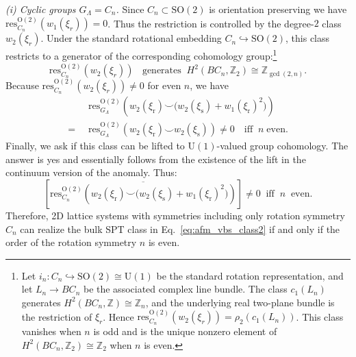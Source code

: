 \documentclass[aps,prx,reprint,superscriptaddress,twocolumn,amsmath,amssymb,amsfonts, nofootinbib]{revtex4-2}
\newcommand{\SO}{\text{SO}}
\newcommand{\res}{\text{res}}
\newcommand{\Z}{\mathbb{Z}}
\theoremstyle{apsstyle}
\begin{document}
\medskip

\noindent\textit{(i) Cyclic groups $G_{\Lambda}=C_{n}$.}
Since $C_{n}\subset \SO(2)$ is orientation preserving we have $\res^{\mathrm{O(2)}}_{C_{n}}(w_{1}(\xi_{r}))=0$. 
Thus the restriction is controlled by the degree-$2$ class $w_2(\xi_r)$. Under the standard rotational embedding $C_n\hookrightarrow\mathrm{SO}(2)$, this class restricts to a generator of the corresponding cohomology group:\footnote{Let $i_n:C_n\hookrightarrow\mathrm{SO}(2)\cong\mathrm{U}(1)$ be the standard rotation representation, and let $L_n\to BC_n$ be the associated complex line bundle. The class $c_1(L_n)$ generates $H^2(BC_n,\mathbb Z)\cong\mathbb Z_n$, and the underlying real two-plane bundle is the restriction of $\xi_r$. Hence $\res_{C_n}^{\mathrm{O}(2)}(w_2(\xi_r)) =\rho_2(c_1(L_n))$. This class vanishes when $n$ is odd and is the unique nonzero element of $H^2(BC_n,\mathbb Z_2)\cong\mathbb Z_2$ when $n$ is even.}
\begin{equation}
    \res^{\mathrm{O(2)}}_{C_n}(w_{2}(\xi_{r}))\;\; \text{ generates}\;\; H^{2}(BC_{n},\Z_{2})\cong \Z_{\gcd(2,n)}.
    \label{eq:cyclic_w2_gcd}
\end{equation}
Because $\res^{\mathrm{O(2)}}_{C_n}(w_{2}(\xi_{r}))\neq 0$ for even $n$, we have
\begin{align}
    &\res^{\mathrm{O(2)}}_{G_{\Lambda}}\left(w_{2}(\xi_{\mathrm{r}})\smile\bigl(w_{2}(\xi_{\mathrm{s}})+w_{1}(\xi_{\mathrm{r}})^{2}\bigr)\right )\nonumber \\
     =\;\;&\res^{\mathrm{O(2)}}_{G_{\Lambda}}\left(w_{2}(\xi_{\mathrm{r}})\smile w_{2}(\xi_{\mathrm{s}})\right )\neq 0
    \quad\text{iff}\;\; n \; \text{even}.
    \label{eq:cyclic_detection1}
\end{align}
Finally, we ask if this class can be lifted to $\mathrm{U}(1)$-valued group cohomology. The answer is yes and essentially follows from the existence of the lift in the continuum version of the anomaly. Thus:
\begin{equation}
    \left[\overline{\res^{\mathrm{O(2)}}_{C_{n}}\left(w_{2}(\xi_{\mathrm{r}})\smile\bigl(w_{2}(\xi_{\mathrm{s}})+w_{1}(\xi_{\mathrm{r}})^{2}\bigr)\right )}\right]\neq 0 \;\;\text{iff} \;\; n\;\; \text{even}.
    \label{eq:cyclic_detection2}
\end{equation}
Therefore, 2D lattice systems with symmetries including only rotation symmetry $C_{n}$ can realize the bulk SPT class in Eq.~\ref{eq:afm_vbs_class2} if and only if the order of the rotation symmetry $n$ is even.
\end{document}
